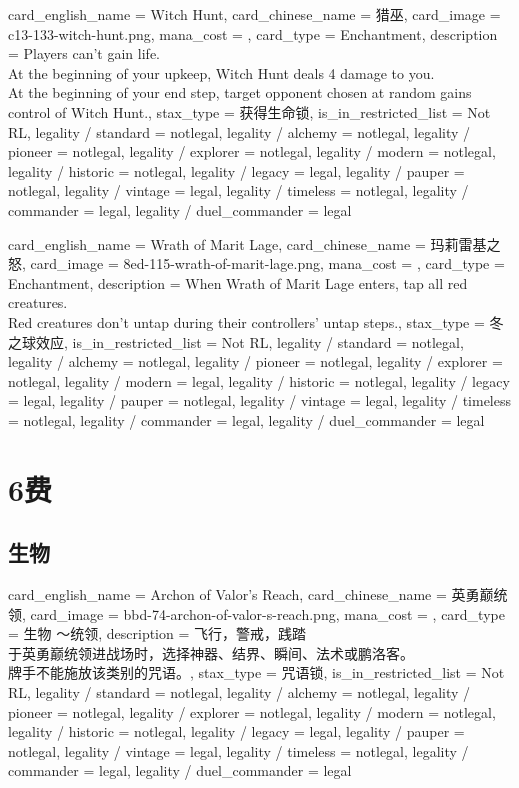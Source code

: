 \documentclass[lang = cn, color = black, 10pt]{AllThatStax}
\begin{document}
\card
{
	card_english_name = {Witch Hunt},
	card_chinese_name = {猎巫},
	card_image = c13-133-witch-hunt.png,
	mana_cost = ,
	card_type = Enchantment,
	description = {Players can't gain life.\\
		At the beginning of your upkeep, Witch Hunt deals 4 damage to you.\\
		At the beginning of your end step, target opponent chosen at random gains control of Witch Hunt.},
	stax_type = 获得生命锁,
	is_in_restricted_list = Not RL,
	legality / standard = notlegal,
	legality / alchemy = notlegal,
	legality / pioneer = notlegal,
	legality / explorer = notlegal,
	legality / modern = notlegal,
	legality / historic = notlegal,
	legality / legacy = legal,
	legality / pauper = notlegal,
	legality / vintage = legal,
	legality / timeless = notlegal,
	legality / commander = legal,
	legality / duel_commander = legal
}

\card
{
	card_english_name = {Wrath of Marit Lage},
	card_chinese_name = {玛莉雷基之怒},
	card_image = 8ed-115-wrath-of-marit-lage.png,
	mana_cost = ,
	card_type = Enchantment,
	description = {When Wrath of Marit Lage enters, tap all red creatures.\\
		Red creatures don't untap during their controllers' untap steps.},
	stax_type = 冬之球效应,
	is_in_restricted_list = Not RL,
	legality / standard = notlegal,
	legality / alchemy = notlegal,
	legality / pioneer = notlegal,
	legality / explorer = notlegal,
	legality / modern = legal,
	legality / historic = notlegal,
	legality / legacy = legal,
	legality / pauper = notlegal,
	legality / vintage = legal,
	legality / timeless = notlegal,
	legality / commander = legal,
	legality / duel_commander = legal
}

\chapter{6费}

\section{生物}

\card
{
	card_english_name = {Archon of Valor's Reach},
	card_chinese_name = {英勇巅统领},
	card_image = bbd-74-archon-of-valor-s-reach.png,
	mana_cost = ,
	card_type = 生物 ～统领,
	description = {飞行，警戒，践踏\\
		于英勇巅统领进战场时，选择神器、结界、瞬间、法术或鹏洛客。\\
		牌手不能施放该类别的咒语。},
	stax_type = 咒语锁,
	is_in_restricted_list = Not RL,
	legality / standard = notlegal,
	legality / alchemy = notlegal,
	legality / pioneer = notlegal,
	legality / explorer = notlegal,
	legality / modern = notlegal,
	legality / historic = notlegal,
	legality / legacy = legal,
	legality / pauper = notlegal,
	legality / vintage = legal,
	legality / timeless = notlegal,
	legality / commander = legal,
	legality / duel_commander = legal
}
\end{document}
